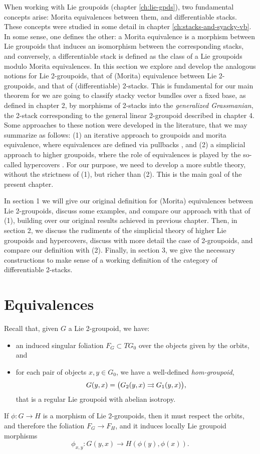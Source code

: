 %
%

When working with Lie groupoids (chapter \ref{ch:lie-gpds}), two fundamental concepts arise: Morita equivalences between them, and differentiable stacks.
These concepts were studied in some detail in chapter \ref{ch:stacks-and-syacky-vb}.
In some sense, one defines the other: a Morita equivalence is a morphism between Lie groupoids that induces an isomorphism between the corresponding stacks,
and conversely, a differentiable stack is defined as the class of a Lie groupoids modulo Morita equivalences.
In this section we explore and develop the analogous notions for Lie 2-groupoids, that of (Morita) equivalence between Lie 2-groupoids, and that of (differentiable) 2-stacks.
This is fundamental for our main theorem for we are going to classify stacky vector bundles over a fixed base, as defined in chapter 2, by morphisms of 2-stacks into the {\it generalized Grassmanian}, the 2-stack corresponding to the general linear 2-groupoid described in chapter 4.
Some approaches to these notion were developed in the literature, that we may summarize as follows: (1) an iterative approach to groupoids and morita equivalence, where equivalences are defined via pullbacks \cite{gs15},
and (2) a simplicial approach to higher groupoids, where the role of equivalences is played by the so-called hypercovers \cite{zhu09}.
For our purpose, we need to develop a more subtle theory, without the strictness of (1), but richer than (2). This is the main goal of the present chapter.

\bigskip

In section 1 we will give our original definition for (Morita) equivalences between Lie 2-groupoids, discuss some examples, and compare our approach with that of (1), building over our original results achieved in previous chapter.
Then, in section 2, we discuss the rudiments of the simplicial theory of higher Lie groupoids and hypercovers, discuss with more detail the case of 2-groupoids, and compare our definition with (2).
Finally, in section 3, we give the necessary constructions to make sense of a working definition of the category of differentiable 2-stacks.


\section{Equivalences}


Recall that, given $G$ a Lie 2-groupoid, we have:
\begin{itemize}
\item an induced singular foliation $F_G\subset TG_0$ over the objects given by the orbits, and
\item for each pair of objects $x,y\in G_0$, we have a well-defined \emph{hom-groupoid},
$$G(y,x)=\big( G_2(y,x)\rightrightarrows G_1(y,x) \big),$$
that is a regular Lie groupoid with abelian isotropy.
\end{itemize}
If $\phi: G\to H$ is a morphism of Lie 2-groupoids, then it must respect the orbits, and therefore the foliation $F_G\to F_H$, and it induces locally Lie groupoid morphisms
$$ \phi_{x,y}: G(y,x) \to H(\phi(y),\phi(x)). $$

